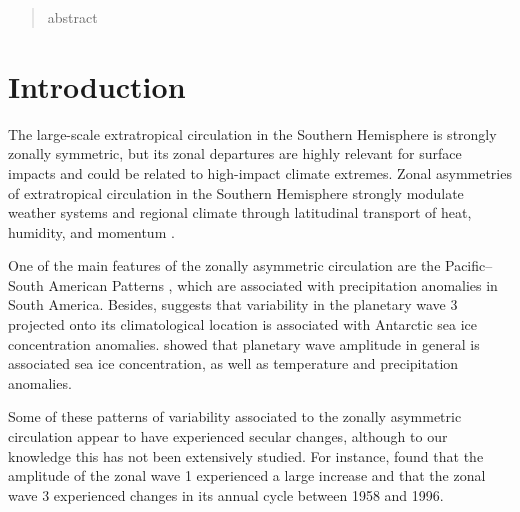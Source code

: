 \documentclass[smallextended]{svjour3}       %
\begin{document}
\date{Received: date / Accepted: date}


\maketitle

\begin{abstract}
abstract
\\
\keywords{
         \and
    }


\end{abstract}


\def\spacingset#1{\renewcommand{\baselinestretch}%
{#1}\small\normalsize} \spacingset{1}


\hypertarget{introduction}{%
\section{Introduction}\label{introduction}}

The large-scale extratropical circulation in the Southern Hemisphere is strongly zonally symmetric, but its zonal departures are highly relevant for surface impacts and could be related to high-impact climate extremes.
Zonal asymmetries of extratropical circulation in the Southern Hemisphere strongly modulate weather systems and regional climate through latitudinal transport of heat, humidity, and momentum \citep{trenberth1980}.

One of the main features of the zonally asymmetric circulation are the Pacific--South American Patterns \citep{mo2001}, which are associated with precipitation anomalies in South America.
Besides, \citet{raphael2007} suggests that variability in the planetary wave 3 projected onto its climatological location is associated with Antarctic sea ice concentration anomalies.
\citet{irving2015} showed that planetary wave amplitude in general is associated sea ice concentration, as well as temperature and precipitation anomalies.

Some of these patterns of variability associated to the zonally asymmetric circulation appear to have experienced secular changes, although to our knowledge this has not been extensively studied.
For instance, \citet{raphael2003} found that the amplitude of the zonal wave 1 experienced a large increase and that the zonal wave 3 experienced changes in its annual cycle between 1958 and 1996.
\end{document}
